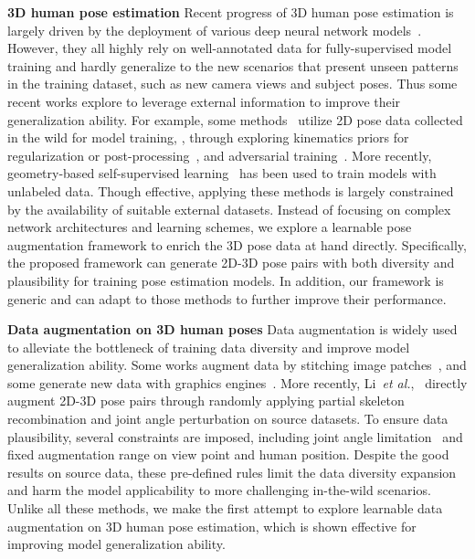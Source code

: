 \documentclass[final]{cvpr}
\newcommand{\et}{\emph{et al.}}
\newcommand{\myparagraph}[1]{{ \noindent \bf #1}}
\begin{document}
\myparagraph{3D human pose estimation}
Recent   progress of 3D human pose estimation is largely driven by the deployment of various deep neural network   models~\cite{tekin2016direct,martinez2017simple,fang2018learning,zhao2019semantic,nibali20193d,cai2019exploiting,sharma2019monocular,zhou2019hemlets}. However, they all   highly rely on well-annotated data for fully-supervised  model training and hardly generalize to the new scenarios that present unseen   patterns in the training dataset, such as new camera views and subject poses. 
Thus some recent works explore to leverage external information to improve their generalization ability. For example, some methods~\cite{zhou2017towards,yang20183d,dabral2018learning,wandt2019repnet,inthewild3d_2019,wang2019generalizing,chen2019weakly,pavllo2019videopose3d,kolotouros2019spin} utilize 2D pose  data collected  in the wild  for model training, \eg, through   exploring  kinematics priors for regularization or post-processing~\cite{zhou2017towards,dabral2018learning,pavllo2019videopose3d}, and adversarial training~\cite{yang20183d,wandt2019repnet}.
More recently, geometry-based self-supervised learning~\cite{rhodin2018unsupervised,drover2018can,chen2019unsupervised,kocabas2019epipolar,pirinen2019domes,ligeometry,rhodin2019neural} has been used 
to train models with   unlabeled {data}. 
Though effective, applying these methods is largely constrained by the availability of suitable external datasets. 
Instead of focusing on complex network architectures and learning schemes, we explore a learnable pose augmentation framework to enrich the 3D pose data at hand directly. Specifically, the proposed framework can generate 2D-3D pose pairs with both diversity and plausibility for training pose estimation models.
In addition, our framework is generic and can adapt to those methods to further improve their performance.


\myparagraph{Data augmentation on 3D human poses}
Data augmentation is widely used to alleviate the bottleneck of training data diversity and improve model generalization ability.
Some works augment data by stitching image patches~\cite{rogez2016mocap,mehta2017vnect,zhang2021bmp}, and some generate new data with graphics engines~\cite{chen2016synthesizing,varol2017learning}. 
More recently,
Li~\et,~\cite{Li_2020_CVPR} directly augment 2D-3D pose pairs through randomly applying partial skeleton recombination and joint angle perturbation on source datasets.
To ensure data plausibility, several constraints are imposed, including joint angle limitation~\cite{akhter2015joint_angle_limit} and fixed augmentation range on view point and human position.
Despite the good results on source data, these pre-defined rules limit the data diversity expansion and harm the model applicability to more challenging in-the-wild scenarios.
Unlike all these methods, we make the first attempt to explore learnable data augmentation on 3D human pose estimation, which is shown effective for improving model generalization ability.
\end{document}
